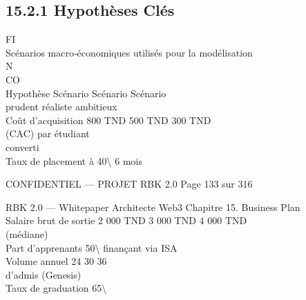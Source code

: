 \subsection{15.2.1 Hypothèses Clés}
\vspace{0.5em}
\vspace{0.5em}
\vspace{0.5em}
\vspace{0.5em}
FI\\
Scénarios macro-économiques utilisés pour la modélisation\\
\vspace{0.5em}
N\\
CO\\
Hypothèse              Scénario      Scénario     Scénario\\
prudent        réaliste   ambitieux\\
Coût d’acquisition     800 TND       500 TND      300 TND\\
(CAC) par étudiant\\
converti\\
Taux de placement à      40\textbackslash{}%
6 mois\\
\vspace{0.5em}
\vspace{0.5em}
\vspace{0.5em}
\vspace{0.5em}
\begin{confidential}CONFIDENTIEL — PROJET RBK 2.0                                Page 133 sur 316\end{confidential}
RBK 2.0 — Whitepaper Architecte Web3                                                                          Chapitre 15. Business Plan\\
\vspace{0.5em}
\vspace{0.5em}
\vspace{0.5em}
Salaire brut de sortie   2 000 TND     3 000 TND   4 000 TND\\
(médiane)\\
Part d’apprenants           50\textbackslash{}%
finançant via ISA\\
Volume annuel                24             30        36\\
d’admis (Genesis)\\
Taux de graduation          65\textbackslash{}%
